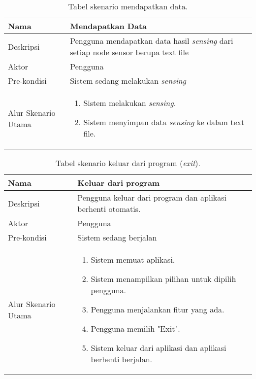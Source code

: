 \begin{table}[H]
    \centering
    \caption{Tabel skenario mendapatkan data.}
    \begin{tabular}{|p{3cm}|p{10cm}|}
    \hline
        Nama & Mendapatkan Data\\
    \hline
    \hline
        Deskripsi & Pengguna mendapatkan data hasil \textit{sensing} dari setiap node sensor berupa text file\\
    \hline
        Aktor & Pengguna \\
    \hline
        Pre-kondisi & Sistem sedang melakukan \textit{sensing} \\
    \hline
        Alur Skenario Utama & 
        \begin{enumerate}
            \item Sistem melakukan \textit{sensing}.
            \item Sistem menyimpan data \textit{sensing} ke dalam text file.
        \end{enumerate}\\
    \hline
    \end{tabular}
    \label{tab:skenario5}
\end{table}

\begin{table}[H]
    \centering
    \caption{Tabel skenario keluar dari program (\textit{exit}).}
    \begin{tabular}{|p{3cm}|p{10cm}|}
    \hline
        Nama & Keluar dari program\\
    \hline
    \hline
        Deskripsi & Pengguna keluar dari program dan aplikasi berhenti otomatis.\\
    \hline
        Aktor & Pengguna \\
    \hline
        Pre-kondisi & Sistem sedang berjalan \\
    \hline
        Alur Skenario Utama & 
        \begin{enumerate}
            \item Sistem memuat aplikasi.
            \item Sistem menampilkan pilihan untuk dipilih pengguna.
            \item Pengguna menjalankan fitur yang ada.
            \item Pengguna memilih "Exit".
            \item Sistem keluar dari aplikasi dan aplikasi berhenti berjalan.
        \end{enumerate}\\
    \hline
    \end{tabular}
    \label{tab:skenario6}
\end{table}

